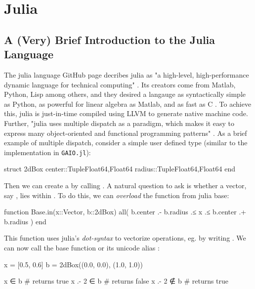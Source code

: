 \section{Julia}


\subsection{A (Very) Brief Introduction to the Julia Language}

The julia language GitHub page decribes julia as "a high-level, high-performance dynamic 
language for technical computing" \cite*{juliarepo}. Its creators come from Matlab, Python,
Lisp among others, and they desired a langauge as syntactically simple as Python, as 
powerful for linear algebra as Matlab, and as fast as C \cite*{julia}. To achieve this,
julia is just-in-time compiled using LLVM to generate native machine code. Further, "julia uses 
multiple dispatch as a paradigm, which makes it easy to express many object-oriented and
functional programming patterns" \cite*{juliamain}. As a brief example of multiple dispatch,
consider a simple user defined type  (similar to the implementation in 
\texttt{GAIO.jl}):

\begin{jllisting}[language=julia, style=jlcodestyle]
    struct 2dBox
        center::Tuple{Float64,Float64}
        radius::Tuple{Float64,Float64}
    end
\end{jllisting}

Then we can create a  by calling . 
A natural question to ask is whether a vector, say , lies within 
. To do this, we can \emph{overload} the function  from julia base:

\begin{jllisting}[language=julia, style=jlcodestyle]
    function Base.in(x::Vector, b::2dBox)
        all( b.center .- b.radius .≤ x .≤ b.center .+ b.radius )
    end
\end{jllisting}

This function uses julia's \emph{dot-syntax} to vectorize operations, eg. \jlinl{+}
by writing . We can now call the base function  or its unicode alias
:

\begin{jllisting}[language=julia, style=jlcodestyle]
    x = [0.5, 0.6]
    b = 2dBox((0.0, 0.0), (1.0, 1.0))

    x ∈ b           # returns true
    x .- 2 ∈ b      # returns false
    x .- 2 ∉ b      # returns true
\end{jllisting}

